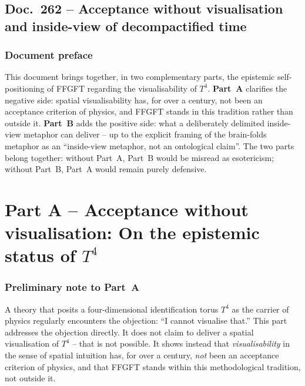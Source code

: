 
\chapter*{Doc.~262 -- Acceptance without visualisation and inside-view of decompactified time}

\section*{Document preface}

This document brings together, in two complementary parts, the
epistemic self-positioning of FFGFT regarding the visualisability of
$T^4$. \textbf{Part~A} clarifies the negative side: spatial
visualisability has, for over a century, not been an acceptance
criterion of physics, and FFGFT stands in this tradition rather than
outside it. \textbf{Part~B} adds the positive side: what a
deliberately delimited inside-view metaphor can deliver -- up to the
explicit framing of the brain-folds metaphor as an
\enquote{inside-view metaphor, not an ontological claim}. The two
parts belong together: without Part~A, Part~B would be misread as
esotericism; without Part~B, Part~A would remain purely defensive.

\part*{Part A -- Acceptance without visualisation: On the epistemic status of $T^4$}

\section*{Preliminary note to Part~A}

A theory that posits a four-dimensional identification torus $T^4$ as
the carrier of physics regularly encounters the objection: ``I cannot
visualise that.'' This part addresses the objection directly. It does
not claim to deliver a spatial visualisation of $T^4$ -- that is not
possible. It shows instead that \emph{visualisability} in the sense of
spatial intuition has, for over a century, \emph{not} been an
acceptance criterion of physics, and that FFGFT stands within this
methodological tradition, not outside it.


